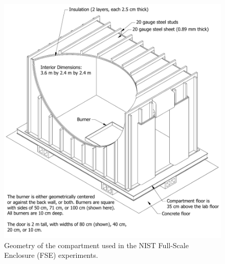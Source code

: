 \begin{figure}[p]
\includegraphics[width=\textwidth]{FIGURES/NIST_FSE_2008/NIST_FSE_2008_Drawing}
\caption[Geometry of the compartment used in the NIST Full-Scale Enclosure experiments]{Geometry of the compartment used in the NIST Full-Scale Enclosure (FSE) experiments.}
\label{NIST_FSE_2008_Drawing}
\end{figure}

